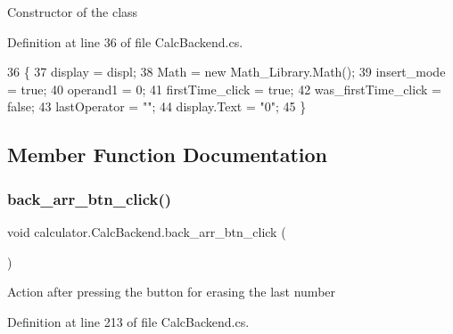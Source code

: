 Constructor of the class 



Definition at line 36 of file Calc\+Backend.\+cs.


\begin{DoxyCode}
36                                             \{
37             display = displ;
38             Math = \textcolor{keyword}{new} Math\_Library.Math();
39             insert\_mode = \textcolor{keyword}{true};
40             operand1 = 0;
41             firstTime\_click = \textcolor{keyword}{true};
42             was\_firstTime\_click = \textcolor{keyword}{false};
43             lastOperator = \textcolor{stringliteral}{""};
44             display.Text = \textcolor{stringliteral}{"0"};
45         \}
\end{DoxyCode}


\subsection{Member Function Documentation}
\mbox{\label{classcalculator_1_1_calc_backend_a988298bb2592f5e977bd16b91ea92d89}} 
\subsubsection{back\+\_\+arr\+\_\+btn\+\_\+click()}
{\footnotesize\ttfamily void calculator.\+Calc\+Backend.\+back\+\_\+arr\+\_\+btn\+\_\+click (\begin{DoxyParamCaption}{ }\end{DoxyParamCaption})}



Action after pressing the button for erasing the last number 



Definition at line 213 of file Calc\+Backend.\+cs.


